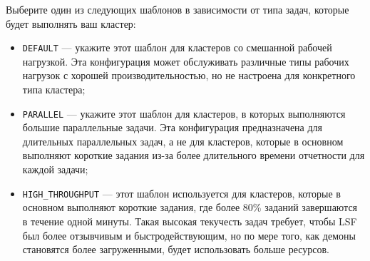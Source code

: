 Выберите один из следующих шаблонов в зависимости от типа задач, которые будет выполнять ваш кластер:

\begin{itemize}
    \item \lstinline {DEFAULT} --- укажите этот шаблон для кластеров со смешанной рабочей нагрузкой. Эта конфигурация может обслуживать различные типы рабочих нагрузок с хорошей производительностью, но не настроена для конкретного типа кластера;
    \item \lstinline {PARALLEL} --- укажите этот шаблон для кластеров, в которых выполняются большие параллельные задачи. Эта конфигурация предназначена для длительных параллельных задач, а не для кластеров, которые в основном выполняют короткие задания из-за более длительного времени отчетности для каждой задачи;
    \item \lstinline {HIGH_THROUGHPUT} --- этот шаблон используется для кластеров, которые в основном выполняют короткие задания, где более 80\% заданий завершаются в течение одной минуты. Такая высокая текучесть задач требует, чтобы LSF был более отзывчивым и быстродействующим, но по мере того, как демоны становятся более загруженными, будет использовать больше ресурсов.
\end{itemize}


